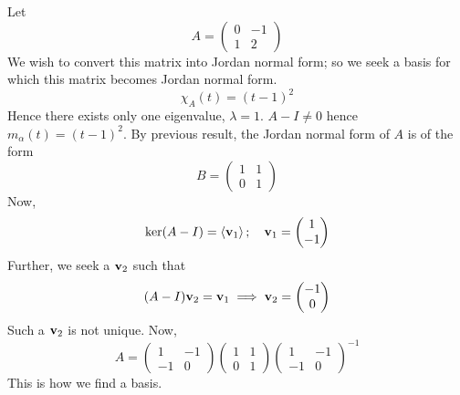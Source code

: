 \documentclass[a4paper,11pt]{article}
\begin{document}
\begin{example}
	Let
	\[
		A = \begin{pmatrix}
			0 & -1 \\
			1 & 2
		\end{pmatrix}
	\]
	We wish to convert this matrix into Jordan normal form; so we seek a basis for which this matrix becomes Jordan normal form.
	\[
		\chi_A(t) = (t-1)^2
	\]
	Hence there exists only one eigenvalue, \( \lambda = 1 \).
	\( A - I \neq 0 \) hence \( m_\alpha(t) = (t-1)^2 \).
	By previous result, the Jordan normal form of \( A \) is of the form
	\[
		B = \begin{pmatrix}
			1 & 1 \\
			0 & 1
		\end{pmatrix}
	\]
	Now,
	\[
		\ker(A - I) = \left\langle{} {\bf v}_1 \right\rangle;\quad {\bf v}_1 = \begin{pmatrix}
			1 \\ -1
		\end{pmatrix}
	\]
	Further, we seek a \( {\bf v}_2 \) such that
	\[
		(A - I){\bf v}_2 = {\bf v}_1 \implies {\bf v}_2 = \begin{pmatrix}
			-1 \\ 0
		\end{pmatrix}
	\]
	Such a \( {\bf v}_2 \) is not unique.
	Now,
	\[
		A = \begin{pmatrix}
			1  & -1 \\
			-1 & 0
		\end{pmatrix}
		\begin{pmatrix}
			1 & 1 \\
			0 & 1
		\end{pmatrix}
		\begin{pmatrix}
			1  & -1 \\
			-1 & 0
		\end{pmatrix}^{-1}
	\]
	This is how we find a basis. 
\end{example}
\end{document}
